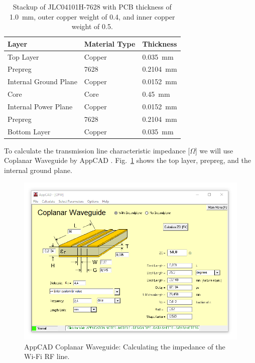 \begin{table}[H]
    \centering
    \caption{Stackup of JLC04101H-7628 with PCB thickness of \SI{1.0}{\milli\meter}, outer copper weight of \SI{0.4}{\ounce}, and inner copper weight of \SI{0.5}{\ounce}\protect\footnotemark.}
    \label{tab:pcb_stackup}
    \begin{tabular}{lll}
    \textbf{Layer} & \textbf{Material Type} & \textbf{Thickness} \\ \hline
    Top Layer & \cellcolor{copper_green}Copper & \SI{0.035}{\milli\meter} \\
    Prepreg & 7628 & \SI{0.2104}{\milli\meter} \\
    Internal Ground Plane & \cellcolor{copper_green}Copper & \SI{0.0152}{\milli\meter} \\
    Core & \cellcolor{core_yellow}Core & \SI{0.45}{\milli\meter} \\
    Internal Power Plane & \cellcolor{copper_green}Copper & \SI{0.0152}{\milli\meter} \\
    Prepreg & 7628 & \SI{0.2104}{\milli\meter} \\
    Bottom Layer & \cellcolor{copper_green}Copper & \SI{0.035}{\milli\meter}
    \end{tabular}
\end{table}

To calculate the transmission line characteristic impedance [$\Omega$] we will use Coplanar Waveguide by AppCAD . Fig.~\ref{fig:appcad} shows the top layer, prepreg, and the internal ground plane.

\begin{figure}[H]
    \centering
    \includegraphics[width=1.0\textwidth]{figures/appcad_16.PNG}
    \caption{AppCAD Coplanar Waveguide: Calculating the impedance of the Wi-Fi RF line.}
    \label{fig:appcad}
\end{figure}

